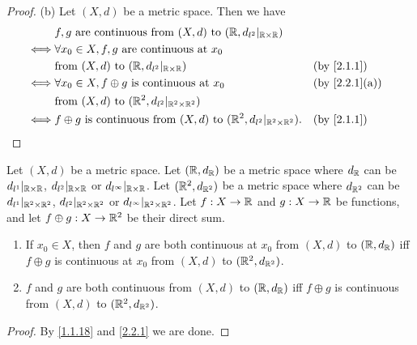 \begin{proof}{(b)}
  Let \((X, d)\) be a metric space.
  Then we have
  \begin{align*}
         & f, g \text{ are continuous from } (X, d) \text{ to } (\R, d_{l^2}|_{\R \times \R})                                              \\
    \iff & \forall x_0 \in X, f, g \text{ are continuous at } x_0                                                                          \\
         & \text{from } (X, d) \text{ to } (\R, d_{l^2}|_{\R \times \R})                                  &  & \by{2.1.1}                  \\
    \iff & \forall x_0 \in X, f \oplus g \text{ is continuous at } x_0                                    &  & \text{(by \cref{2.2.1}(a))} \\
         & \text{from } (X, d) \text{ to } (\R^2, d_{l^2}|_{\R^2 \times \R^2})                                                             \\
    \iff & f \oplus g \text{ is continuous from } (X, d) \text{ to } (\R^2, d_{l^2}|_{\R^2 \times \R^2}). &  & \by{2.1.1}
  \end{align*}
\end{proof}

\begin{ac}\label{ac:2.2.1}
  Let \((X, d)\) be a metric space.
  Let \((\mathbb{R}, d_{\mathbb{R}})\) be a metric space where \(d_{\mathbb{R}}\) can be \(d_{l^1}|_{\mathbb{R} \times \mathbb{R}}\), \(d_{l^2}|_{\mathbb{R} \times \mathbb{R}}\) or \(d_{l^\infty}|_{\mathbb{R} \times \mathbb{R}}\).
  Let \((\mathbb{R}^2, d_{\mathbb{R}^2})\) be a metric space where \(d_{\mathbb{R}^2}\) can be \(d_{l^1}|_{\mathbb{R}^2 \times \mathbb{R}^2}\), \(d_{l^2}|_{\mathbb{R}^2 \times \mathbb{R}^2}\) or \(d_{l^\infty}|_{\mathbb{R}^2 \times \mathbb{R}^2}\).
  Let \(f : X \to \mathbb{R}\) and \(g : X \to \mathbb{R}\) be functions, and let \(f \oplus g : X \to \mathbb{R}^2\) be their direct sum.
  \begin{enumerate}
    \item If \(x_0 \in X\), then \(f\) and \(g\) are both continuous at \(x_0\) from \((X, d)\) to \((\mathbb{R}, d_{\mathbb{R}})\) iff \(f \oplus g\) is continuous at \(x_0\) from \((X, d)\) to \((\mathbb{R}^2, d_{\mathbb{R}^2})\).
    \item \(f\) and \(g\) are both continuous from \((X, d)\) to \((\mathbb{R}, d_{\mathbb{R}})\) iff \(f \oplus g\) is continuous from \((X, d)\) to \((\mathbb{R}^2, d_{\mathbb{R}^2})\).
  \end{enumerate}
\end{ac}

\begin{proof}
  By \cref{1.1.18} and \cref{2.2.1} we are done.
\end{proof}

